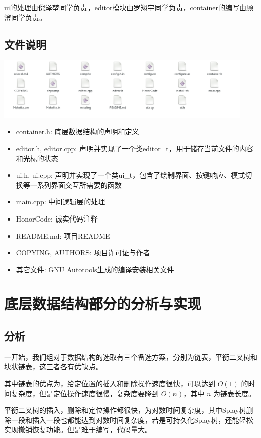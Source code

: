 \documentclass[a4paper,9pt]{article}
\begin{document}
ui的处理由倪泽堃同学负责，editor模块由罗翔宇同学负责，container的编写由顾澄同学负责。

\subsection{文件说明}

\begin{center}
	\includegraphics[height=3cm]{file.png}
\end{center}

\begin{itemize}
	\item{container.h:} 底层数据结构的声明和定义
	\item{editor.h, editor.cpp:} 声明并实现了一个类editor\_t，用于储存当前文件的内容和光标的状态
	\item{ui.h, ui.cpp:} 声明并实现了一个类ui\_t，包含了绘制界面、按键响应、模式切换等一系列界面交互所需要的函数
	\item{main.cpp:} 中间逻辑层的处理
	\item{HonorCode:} 诚实代码注释
	\item{README.md:} 项目README
	\item{COPYING, AUTHORS:} 项目许可证与作者
	\item{其它文件:} GNU Autotools生成的编译安装相关文件
\end{itemize}

\section{底层数据结构部分的分析与实现}
\subsection{分析}
一开始，我们组对于数据结构的选取有三个备选方案，分别为链表，平衡二叉树和块状链表，这三者各有优缺点。

其中链表的优点为，给定位置的插入和删除操作速度很快，可以达到 $O(1)$ 的时间复杂度，但是定位操作速度很慢，复杂度要降到 $O(n)$，其中 $n$ 为链表长度。

平衡二叉树的插入，删除和定位操作都很快，为对数时间复杂度，其中Splay树删除一段和插入一段也都能达到对数时间复杂度，若是可持久化Splay树，还能轻松实现撤销恢复功能。但是难于编写，代码量大。
\end{document}
